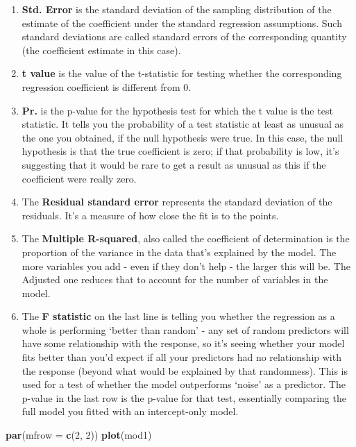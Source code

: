 \documentclass[
]{article}
\newenvironment{Shaded}{\begin{snugshade}}{\end{snugshade}}
\newcommand{\AttributeTok}[1]{\textcolor[rgb]{0.13,0.29,0.53}{#1}}
\newcommand{\DecValTok}[1]{\textcolor[rgb]{0.00,0.00,0.81}{#1}}
\newcommand{\FunctionTok}[1]{\textcolor[rgb]{0.13,0.29,0.53}{\textbf{#1}}}
\newcommand{\NormalTok}[1]{#1}
\providecommand{\tightlist}{%
  \setlength{\itemsep}{0pt}\setlength{\parskip}{0pt}}
\begin{document}
\begin{enumerate}
\def\labelenumi{\arabic{enumi}.}
\tightlist
\item
  \textbf{Std. Error} is the standard deviation of the sampling
  distribution of the estimate of the coefficient under the standard
  regression assumptions. Such standard deviations are called standard
  errors of the corresponding quantity (the coefficient estimate in this
  case).
\item
  \textbf{t value} is the value of the t-statistic for testing whether
  the corresponding regression coefficient is different from 0.
\item
  \textbf{Pr.} is the p-value for the hypothesis test for which the t
  value is the test statistic. It tells you the probability of a test
  statistic at least as unusual as the one you obtained, if the null
  hypothesis were true. In this case, the null hypothesis is that the
  true coefficient is zero; if that probability is low, it's suggesting
  that it would be rare to get a result as unusual as this if the
  coefficient were really zero.
\item
  The \textbf{Residual standard error} represents the standard deviation
  of the residuals. It's a measure of how close the fit is to the
  points.
\item
  The \textbf{Multiple R-squared}, also called the coefficient of
  determination is the proportion of the variance in the data that's
  explained by the model. The more variables you add - even if they
  don't help - the larger this will be. The Adjusted one reduces that to
  account for the number of variables in the model.
\item
  The \textbf{F statistic} on the last line is telling you whether the
  regression as a whole is performing `better than random' - any set of
  random predictors will have some relationship with the response, so
  it's seeing whether your model fits better than you'd expect if all
  your predictors had no relationship with the response (beyond what
  would be explained by that randomness). This is used for a test of
  whether the model outperforms `noise' as a predictor. The p-value in
  the last row is the p-value for that test, essentially comparing the
  full model you fitted with an intercept-only model.
\end{enumerate}

\begin{Shaded}
\begin{Highlighting}[]
\FunctionTok{par}\NormalTok{(}\AttributeTok{mfrow =} \FunctionTok{c}\NormalTok{(}\DecValTok{2}\NormalTok{, }\DecValTok{2}\NormalTok{))}
\FunctionTok{plot}\NormalTok{(mod1)}
\end{Highlighting}
\end{Shaded}
\end{document}
